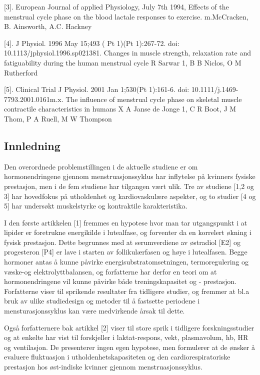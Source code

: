 \documentclass[
  letterpaper,
  DIV=11,
  numbers=noendperiod]{scrreprt}
\begin{document}
{[}3{]}. European Journal of applied Physiology, July 7th 1994, Effects
of the menstrual cycle phase on the blood lactale responses to exercise.
m.McCracken, B. Ainsworth, A.C. Hackney

{[}4{]}. J Physiol. 1996 May 15;493 ( Pt 1)(Pt 1):267-72. doi:
10.1113/jphysiol.1996.sp021381. Changes in muscle strength, relaxation
rate and fatiguability during the human menstrual cycle R Sarwar 1, B B
Niclos, O M Rutherford

{[}5{]}. Clinical Trial J Physiol. 2001 Jan 1;530(Pt 1):161-6. doi:
10.1111/j.1469-7793.2001.0161m.x. The influence of menstrual cycle phase
on skeletal muscle contractile characteristics in humans X A Janse de
Jonge 1, C R Boot, J M Thom, P A Ruell, M W Thompson

\hypertarget{innledning}{%
\subsection{Innledning}\label{innledning}}

Den overordnede problemstillingen i de aktuelle studiene er om
hormonendringene gjennom menstruasjonssyklus har inflytelse på kvinners
fysiske prestasjon, men i de fem studiene har tilgangen vært ulik. Tre
av studiene {[}1,2 og 3{]} har hovedfokus på utholdenhet og
kardiovaskulære aspekter, og to studier {[}4 og 5{]} har undersøkt
muskelstyrke og kontraktile karakteristika.

I den første artikkelen {[}1{]} fremmes en hypotese hvor man tar
utgangspunkt i at lipider er foretrukne energikilde i lutealfase, og
forventer da en korrelert økning i fysisk prestasjon. Dette begrunnes
med at serumverdiene av østradiol {[}E2{]} og progesteron {[}P4{]} er
lave i starten av follikulærfasen og høye i lutealfasen. Begge hormoner
antas å kunne påvirke energisubstratomsetningen, termoregulering og
væske-og elektrolyttbalansen, og forfatterne har derfor en teori om at
hormonendringene vil kunne påvirke både treningskapasitet og -
prestasjon. Forfatterne viser til sprikende resultater fra tidligere
studier, og fremmer at bl.a bruk av ulike studiedesign og metoder til å
fastsette periodene i mensturasjonssyklus kan være medvirkende årsak til
dette.

Også forfatternere bak artikkel {[}2{]} viser til store sprik i
tidligere forskningsstudier og at enkelte har vist til forskjeller i
laktat-respons, vekt, plasmavolum, hb, HR og ventilasjon. De presenterer
ingen egen hypotese, men formulerer at de ønsker å evaluere fluktuasjon
i utholdenhetskapasiteten og den cardiorespiratoriske prestasjon hos
øst-indiske kvinner gjennom menstruasjonssyklus.
\end{document}
